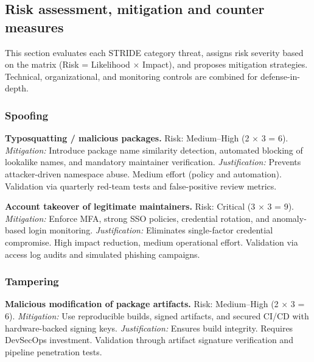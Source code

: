 \documentclass[letterpaper,12pt]{report}
\begin{document}
\newpage

\subsection{Risk assessment, mitigation and counter measures}

This section evaluates each STRIDE category threat, assigns risk severity based on the 
matrix (Risk = Likelihood $\times$ Impact), and proposes mitigation strategies.  
Technical, organizational, and monitoring controls are combined for defense-in-depth.

\subsubsection*{Spoofing}

\textbf{Typosquatting / malicious packages.}  
Risk: Medium--High (2 $\times$ 3 = 6).  
\emph{Mitigation:} Introduce package name similarity detection, automated blocking of 
lookalike names, and mandatory maintainer verification.  
\emph{Justification:} Prevents attacker-driven namespace abuse. Medium effort (policy and 
automation). Validation via quarterly red-team tests and false-positive review metrics.  

\textbf{Account takeover of legitimate maintainers.}  
Risk: Critical (3 $\times$ 3 = 9).  
\emph{Mitigation:} Enforce MFA, strong SSO policies, credential rotation, and anomaly-based 
login monitoring.  
\emph{Justification:} Eliminates single-factor credential compromise. High impact reduction, 
medium operational effort. Validation via access log audits and simulated phishing campaigns.  

\subsubsection*{Tampering}

\textbf{Malicious modification of package artifacts.}  
Risk: Medium--High (2 $\times$ 3 = 6).  
\emph{Mitigation:} Use reproducible builds, signed artifacts, and secured CI/CD with 
hardware-backed signing keys.  
\emph{Justification:} Ensures build integrity. Requires DevSecOps investment. Validation 
through artifact signature verification and pipeline penetration tests.  
\end{document}

